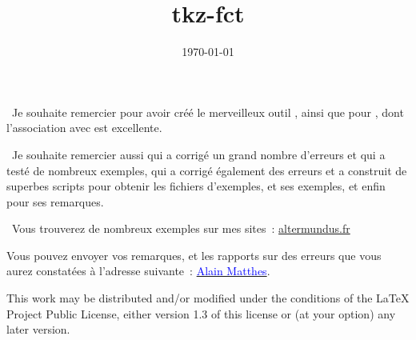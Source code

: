 \documentclass[DIV         = 14,
               fontsize    = 10,
               headinclude = false,
               index       = totoc,
               footinclude = false,
               twoside,
               headings    = small
               ]{tkz-doc}
\gdef\tkznameofpack{tkz-fct}
\begin{document}
\title{\tkznameofpack}
\date{\today}
\clearpage
\thispagestyle{empty}
\maketitle

\clearpage


\nameoffile{\tkznameofpack}


\presentation

\vspace*{24pt}
\noindent\lefthand\ Je souhaite remercier  pour avoir créé le merveilleux outil \tkzname{\TIKZ}, ainsi que  pour , dont l'association avec  est excellente.


\vspace*{12pt}
\noindent\lefthand\ Je souhaite remercier aussi   qui a corrigé un grand nombre d'erreurs et qui a testé de nombreux exemples,   qui a corrigé également des erreurs et a construit de superbes scripts pour obtenir les fichiers d'exemples,    et ses exemples, et enfin   pour ses remarques.

\vspace*{12pt}
\noindent\lefthand\ Vous trouverez de nombreux exemples sur mes sites~:
\href{http://altermundus.fr}{altermundus.fr}

\vfill
Vous pouvez envoyer vos remarques, et les rapports sur des erreurs que vous aurez constatées à l'adresse suivante~: \href{mailto:al.ma@mac.com}{\textcolor{blue}{Alain Matthes}}.

This work may be distributed and/or modified under the
conditions of the LaTeX Project Public License, either version 1.3
of this license or (at your option) any later version.



\clearpage
\tableofcontents

\clearpage
\newpage

\setlength{\parskip}{1ex plus 0.5ex minus 0.2ex}
\end{document}
